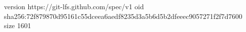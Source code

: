 version https://git-lfs.github.com/spec/v1
oid sha256:72f879870d95161c55dceea6aedf8235d3a5b6d5b2dfeeec9057271f2f7d7600
size 1601
